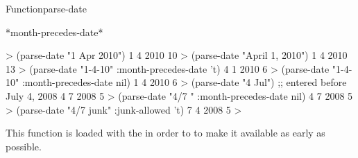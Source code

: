 \documentclass[10pt,twoside,english,pdftex]{article}
\begin{document}
\begin{functiondoc}{Function}{parse-date}{%
     
    }
\begin{alsos}{*month-precedes-date*}
\end{alsos}

\fnexamples
%
\W\supp
\begin{example}
  > (parse-date "1 Apr 2010")
  1
  4
  2010
  10
  > (parse-date "April 1, 2010")
  1
  4
  2010
  13\goodpagebreak
  > (parse-date "1-4-10" :month-precedes-date 't)
  4
  1
  2010
  6
  > (parse-date "1-4-10" :month-precedes-date nil)
  1
  4
  2010
  6\goodpagebreak
  > (parse-date "4 Jul") \textcolor{darkergray}{;; entered before July 4, 2008}
  4
  7
  2008
  5
  > (parse-date "4/7  " :month-precedes-date nil)
  4
  7
  2008
  5\goodpagebreak
  > (parse-date "4/7  junk" :junk-allowed 't)
  7
  4
  2008
  5
  >
\end{example}

\fnnote
{}%
%
%
This function is loaded with the  
in order to to make it available as early as possible.
\end{functiondoc}

\end{document}
